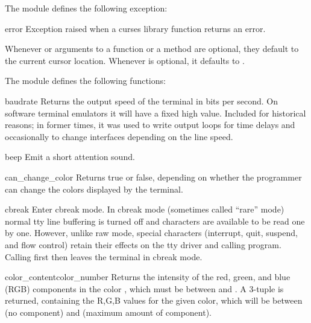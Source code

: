 The module  defines the following exception:

\begin{excdesc}{error}
Exception raised when a curses library function returns an error.
\end{excdesc}

 Whenever  or  arguments to a function
or a method are optional, they default to the current cursor location.
Whenever  is optional, it defaults to .

The module  defines the following functions:

\begin{funcdesc}{baudrate}{}
Returns the output speed of the terminal in bits per second.  On
software terminal emulators it will have a fixed high value.
Included for historical reasons; in former times, it was used to 
write output loops for time delays and occasionally to change
interfaces depending on the line speed.
\end{funcdesc}

\begin{funcdesc}{beep}{}
Emit a short attention sound.
\end{funcdesc}

\begin{funcdesc}{can_change_color}{}
Returns true or false, depending on whether the programmer can change
the colors displayed by the terminal.
\end{funcdesc}

\begin{funcdesc}{cbreak}{}
Enter cbreak mode.  In cbreak mode (sometimes called ``rare'' mode)
normal tty line buffering is turned off and characters are available
to be read one by one.  However, unlike raw mode, special characters
(interrupt, quit, suspend, and flow control) retain their effects on
the tty driver and calling program.  Calling first 
then  leaves the terminal in cbreak mode.
\end{funcdesc}

\begin{funcdesc}{color_content}{color_number}
Returns the intensity of the red, green, and blue (RGB) components in
the color , which must be between  and
.  A 3-tuple is returned, containing the R,G,B values
for the given color, which will be between  (no component) and
 (maximum amount of component).
\end{funcdesc}

